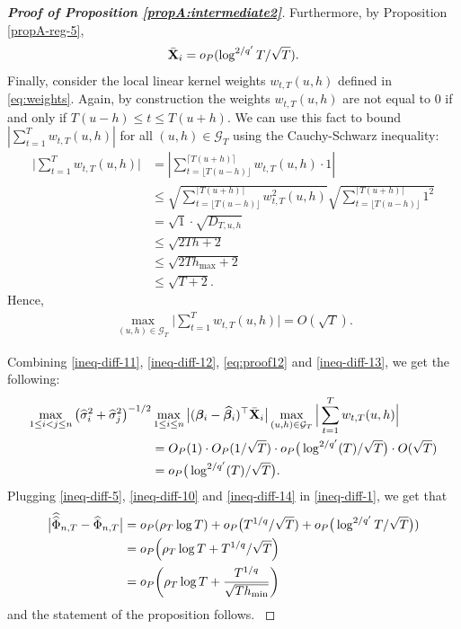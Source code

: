 \begin{proof}[\textnormal{\textbf{Proof of Proposition \ref{propA:intermediate2}}}]
Furthermore, by Proposition \ref{propA-reg-5}, 
{\color{red}\begin{align}\label{eq:proof12}
\bar{\mathbf{X}}_i = o_P(\log^{2/{q^\prime}}{T}/\sqrt{T}).
\end{align}}
Finally, consider the local linear kernel weights $w_{t,T}(u,h)$ defined in \eqref{eq:weights}. Again, by construction the weights $w_{t, T}(u, h)$ are not equal to $0$ if and only if \linebreak $T(u-h) \le t \le T(u+h)$. We can use this fact to bound  $\left| \sum_{t=1}^T w_{t,T}(u,h)  \right|$ for all $(u, h) \in \mathcal{G}_T$ using the Cauchy-Schwarz inequality:
\begin{align*}
\Big| \sum_{t=1}^T w_{t,T}(u,h)   \Big| & = \left| \sum_{t=\lfloor T(u-h) \rfloor}^{\lceil T(u+h) \rceil} w_{t,T}(u,h) \cdot 1  \right|  \\
&\leq \sqrt{\sum_{t=\lfloor T(u-h) \rfloor}^{\lceil T(u+h) \rceil} w^2_{t,T}(u,h)}\sqrt{\sum_{t=\lfloor T(u-h) \rfloor}^{\lceil T(u+h) \rceil} 1^2}\\
&=\sqrt{1}\cdot\sqrt{D_{T, u, h}} \\
&  \leq \sqrt{2Th + 2} \\
&\leq \sqrt{2Th_{\max} +2} \\
&\leq\sqrt{T+2}.
\end{align*}
Hence, 
\begin{align}\label{ineq-diff-13}
\max_{(u,h) \in \mathcal{G}_T}  \Big| \sum_{t=1}^T w_{t,T}(u,h)  \Big| = O(\sqrt{T}).
\end{align}

Combining \eqref{ineq-diff-11}, \eqref{ineq-diff-12}, \eqref{eq:proof12} and \eqref{ineq-diff-13}, we get the following:
{\color{red}\begin{align}\label{ineq-diff-14}
\begin{split}
\max_{1\le i < j \le n} \big(\widehat{\sigma}_i^2+ \widehat{\sigma}_j^2 \big)^{-1/2}&\max_{1\le i  \le n}\big|(\bm{\beta}_i - \widehat{\bm{\beta}}_i)^\top\bar{\mathbf{X}}_{i}\big| \max_{(u,h) \in \mathcal{G}_T}  \Big| \sum_{t=1}^T w_{t,T}(u,h)  \Big|   \\
&=O_P(1) \cdot O_P(1/\sqrt{T}) \cdot o_P\big(\log^{2/{q^\prime}}(T)/\sqrt{T}\big) \cdot O(\sqrt{T})\\
& = o_P\big(\log^{2/{q^\prime}}(T)/\sqrt{T}\big).
\end{split}
\end{align}}
Plugging \eqref{ineq-diff-5}, \eqref{ineq-diff-10} and \eqref{ineq-diff-14} in \eqref{ineq-diff-1}, we get that 
{\color{red}\begin{align*}
\big|\widehat{\widehat{\Phi}}_{n,T} - \widehat{\Phi}_{n,T}\big| &= o_P(\rho_T\log{T}) + o_P\big(T^{1/q}/\sqrt{T}) + o_P\big(\log^{2/{q^\prime}}{T}/\sqrt{T}\big)) \\
& = o_P\Big(\rho_T\log{T} + T^{1/q}/\sqrt{T}\Big)\\
& = o_P\bigg(\rho_T\log{T} + \frac{T^{1/q}}{\sqrt{T h_{\min}}}\bigg)
\end{align*}
and the statement of the proposition follows.
}
\end{proof}




